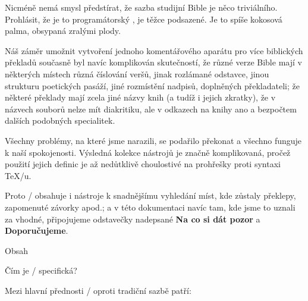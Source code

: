 {Nicméně nemá smysl předstírat, že sazba studijní Bible je něco triviálního.  
Prohlásit, že  je to programátorský , je těžce podsazené. 
Je to spíše kokosová palma, obsypaná zralými plody.

Náš záměr umožnit vytvoření jednoho komentářového aparátu pro více biblických překladů současně byl
navíc komplikován skutečností, že různé verze Bible mají v některých místech různá číslování veršů, jinak rozlámané odstavce, 
jinou strukturu poetických pasáží, jiné rozmístění nadpisů, doplněných překladateli; že 
některé překlady mají zcela jiné názvy knih (a tudíž i jejich zkratky),
že  v názvech souborů nelze mít diakritiku, 
ale v odkazech na knihy ano a bezpočtem dalších podobných specialitek.

Všechny problémy, na které jsme narazili, se podařilo překonat a všechno funguje k naší spokojenosti.  Výsledná kolekce nástrojů je značně komplikovaná,
pročež použití jejich definic je až nedůtklivě choulostivé na prohřešky proti syntaxi \TeX/u.

Proto \OpBible/ obsahuje i nástroje k snadnějšímu vyhledání míst, kde zůstaly překlepy, zapomenuté závorky apod.; a v této dokumentaci navíc
tam, kde jsme to uznali za vhodné, připojujeme  odstavečky nadepsané {\bf Na co si dát pozor} a {\bf Doporučujeme}.



\vfill 

\eject








%




\notoc\nonum\sec Obsah
\maketoc
\vfil\break



\sec Čím je \OpBible/ specifická?

Mezi hlavní přednosti \OpBible/ oproti tradiční sazbě patří:

}
